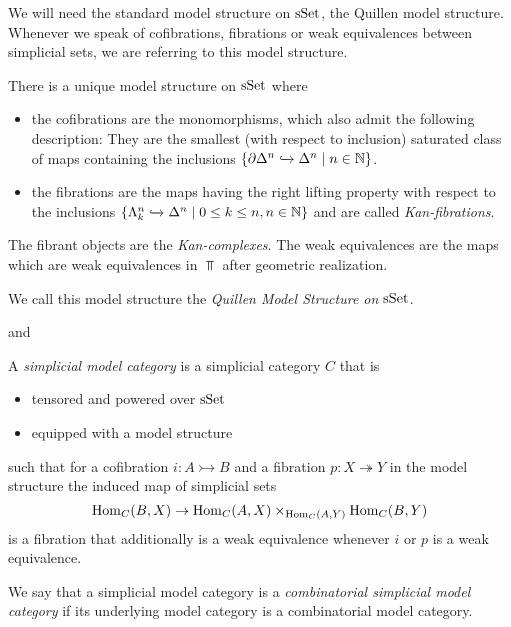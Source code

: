 We will need the standard model structure on $\operatorname{sSet}$, the Quillen model structure. 
Whenever we speak of cofibrations, fibrations or weak equivalences between simplicial sets, we are referring to this model structure.
\begin{thm}
    There is a unique model structure on $\operatorname{sSet}$ where 
    \begin{itemize}
        \item the cofibrations are the monomorphisms, which also admit the following description: 
        They are the smallest (with respect to inclusion) saturated class of maps containing the inclusions $\left\lbrace\partial\Delta^n\xhookrightarrow{}\Delta^n\mid n\in\mathbb{N}\right\rbrace$.
        \item the fibrations are the maps having the right lifting property with respect to the inclusions $\left\lbrace\Lambda_k^n\xhookrightarrow{}\Delta^n\mid 0\leq k\leq n, n\in\mathbb{N}\right\rbrace$ and are called \emph{Kan-fibrations}.
    \end{itemize}
    The fibrant objects are the \emph{Kan-complexes}.
    The weak equivalences are the maps which are weak equivalences in $\Top$ after geometric realization.

    We call this model structure the \emph{Quillen Model Structure on $\operatorname{sSet}$}.
    \begin{reference}
        \cite[Theorem 3.1.8 and Theorem 3.1.29]{cisinski_2019} and \cite[Chap. II, \S 3, Theorem 1]{Quillen1967}
    \end{reference}
\end{thm}
\begin{definition}
    A \emph{simplicial model category} is a simplicial category $C$ that is 
    \begin{itemize}
        \item tensored and powered over $\operatorname{sSet}$
        \item equipped with a model structure
    \end{itemize} 
    such that for a cofibration $i:A\rightarrowtail B$ and a fibration $p:X\twoheadrightarrow Y$ in the model structure the induced map of simplicial sets
    \begin{equation*}
        \operatorname{Hom}_C(B,X)\to\operatorname{Hom}_C(A,X)\times_{\operatorname{Hom}_C(A,Y)}\operatorname{Hom}_C(B,Y)
    \end{equation*}
    is a fibration that additionally is a weak equivalence whenever $i$ or $p$ is a weak equivalence.
    
    We say that a simplicial model category is a \emph{combinatorial simplicial model category} if its underlying model category is a combinatorial model category.
\end{definition}

